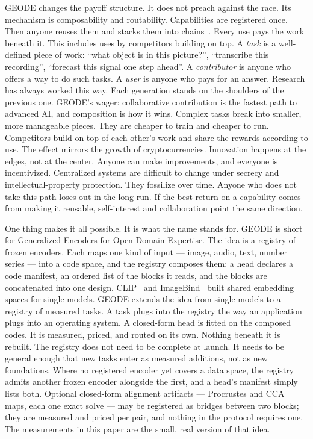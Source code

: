 \documentclass[11pt]{article}
\begin{document}
GEODE changes the payoff structure. It does not preach against the
race. Its mechanism is composability and routability. Capabilities
are registered once. Then anyone reuses them and stacks them into
chains~\cite{schick2023}. Every use pays the work beneath it.
This includes uses by competitors building on top. A \emph{task} is
a well-defined piece of work: ``what object is in this picture?'',
``transcribe this recording'', ``forecast this signal one step
ahead''. A \emph{contributor} is anyone who offers a way to do
such tasks. A \emph{user} is anyone who pays for an answer.
Research has always worked this way. Each generation stands on the
shoulders of the previous one. GEODE's wager: collaborative
contribution is the fastest path to advanced AI, and composition
is how it wins. Complex tasks break into smaller, more manageable
pieces. They are cheaper to train and cheaper to run. Competitors
build on top of each other's work and share the rewards according
to use. The effect mirrors the growth of cryptocurrencies.
Innovation happens at the edges, not at the center. Anyone can
make improvements, and everyone is incentivized. Centralized
systems are difficult to change under secrecy and
intellectual-property protection. They fossilize over time.
Anyone who does not take this path loses out in the long run. If
the best return on a capability comes from making it reusable,
self-interest and collaboration point the same direction.

One thing makes it all possible. It is what the name stands for.
GEODE is short for Generalized Encoders for Open-Domain Expertise.
The idea is a registry of frozen encoders. Each maps one kind of
input --- image, audio, text, number series --- into a code space,
and the registry composes them: a head declares a code manifest, an
ordered list of the blocks it reads, and the blocks are
concatenated into one design. CLIP~\cite{clip2021} and
ImageBind~\cite{imagebind2023} built shared embedding spaces for
single models. GEODE extends the idea from single models to a
registry of measured tasks. A task plugs into the registry the way
an application plugs into an operating system. A closed-form head
is fitted on the composed codes. It is measured, priced, and routed
on its own. Nothing beneath it is rebuilt. The registry does not
need to be complete at launch. It needs to be general enough that
new tasks enter as measured additions, not as new foundations.
Where no registered encoder yet covers a data space, the registry
admits another frozen encoder alongside the first, and a head's
manifest simply lists both. Optional closed-form alignment
artifacts --- Procrustes and CCA maps, each one exact solve ---
may be registered as bridges between two blocks; they are measured
and priced per pair, and nothing in the protocol requires one.
The measurements in this paper are the small, real version of that
idea.
\end{document}
